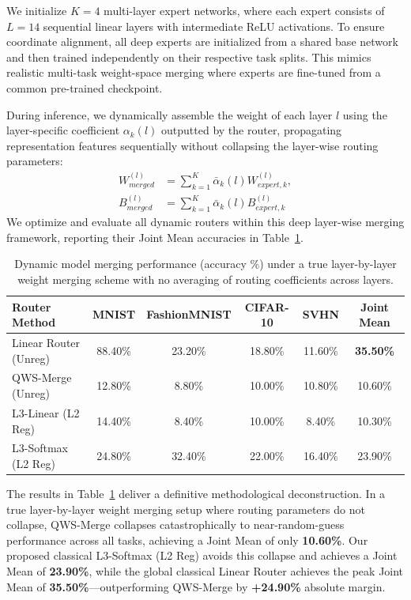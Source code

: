 We initialize $K=4$ multi-layer expert networks, where each expert consists of $L=14$ sequential linear layers with intermediate ReLU activations. To ensure coordinate alignment, all deep experts are initialized from a shared base network and then trained independently on their respective task splits. This mimics realistic multi-task weight-space merging where experts are fine-tuned from a common pre-trained checkpoint.

During inference, we dynamically assemble the weight of each layer $l$ using the layer-specific coefficient $\alpha_k(l)$ outputted by the router, propagating representation features sequentially without collapsing the layer-wise routing parameters:
\begin{align}
    W_{merged}^{(l)} &= \sum_{k=1}^K \bar{\alpha}_k(l) W_{expert, k}^{(l)}, \\
    B_{merged}^{(l)} &= \sum_{k=1}^K \bar{\alpha}_k(l) B_{expert, k}^{(l)}
\end{align}
We optimize and evaluate all dynamic routers within this deep layer-wise merging framework, reporting their Joint Mean accuracies in Table~\ref{tab:layerwise_no_avg}.

\begin{table}[h]
\centering
\caption{Dynamic model merging performance (accuracy \%) under a true layer-by-layer weight merging scheme with no averaging of routing coefficients across layers.}
\label{tab:layerwise_no_avg}
\begin{tabular}{lccccc}
\toprule
\textbf{Router Method} & \textbf{MNIST} & \textbf{FashionMNIST} & \textbf{CIFAR-10} & \textbf{SVHN} & \textbf{Joint Mean} \\
\midrule
Linear Router (Unreg) & 88.40\% & 23.20\% & 18.80\% & 11.60\% & \textbf{35.50\%} \\
QWS-Merge (Unreg) & 12.80\% & 8.80\% & 10.00\% & 10.80\% & 10.60\% \\
L3-Linear (L2 Reg) & 14.40\% & 8.40\% & 10.00\% & 8.40\% & 10.30\% \\
L3-Softmax (L2 Reg) & 24.80\% & 32.40\% & 22.00\% & 16.40\% & 23.90\% \\
\bottomrule
\end{tabular}
\end{table}

The results in Table~\ref{tab:layerwise_no_avg} deliver a definitive methodological deconstruction. In a true layer-by-layer weight merging setup where routing parameters do not collapse, QWS-Merge collapses catastrophically to near-random-guess performance across all tasks, achieving a Joint Mean of only \textbf{10.60\%}. Our proposed classical L3-Softmax (L2 Reg) avoids this collapse and achieves a Joint Mean of \textbf{23.90\%}, while the global classical Linear Router achieves the peak Joint Mean of \textbf{35.50\%}—outperforming QWS-Merge by \textbf{+24.90\%} absolute margin. 

